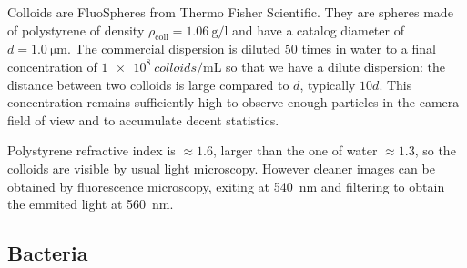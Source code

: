 \documentclass[%
 aip,
 jmp,%
 amsmath,amssymb,
reprint,%
]{revtex4-1}
\begin{document}
Colloids are FluoSpheres\circledR{} from Thermo Fisher Scientific. They are spheres made of polystyrene of density $\rho_\text{coll} = \SI{1.06}{\gram\per\litre}$ and have a catalog diameter of $d = \SI{1.0}{\micro\meter}$. The commercial dispersion is diluted 50 times in water to a final concentration of $\SI{1e8}{colloids\per\milli\liter}$ so that we have a dilute dispersion: the distance between two colloids is large compared to $d$, typically $10 d$. This concentration remains sufficiently high to observe enough particles in the camera field of view and to accumulate decent statistics.

Polystyrene refractive index is $\approx 1.6$, larger than the one of water $\approx 1.3$, so the colloids are visible by usual light microscopy. However cleaner images can be obtained by fluorescence microscopy, exiting at \SI{540}{\nano\metre} and filtering to obtain the emmited light at \SI{560}{\nano\metre}.


\subsection{Bacteria}
\end{document}
